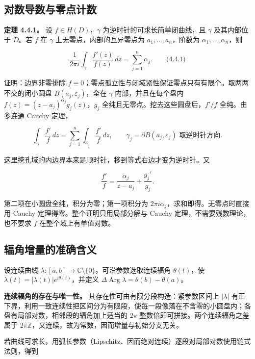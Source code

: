\documentclass[11pt,a4paper]{article}
\begin{document}
\subsection{对数导数与零点计数}\label{ch04-s4-heading-1}

\textbf{定理 4.4.1。} 设 \(f\in H(D)\)，\(\gamma\)
为逆时针的可求长简单闭曲线，且 \(\gamma\) 及其内部位于 \(D\)。若 \(f\)
在 \(\gamma\) 上无零点，内部的互异零点为 \(a_1,\ldots,a_n\)，阶数为
\(\alpha_1,\ldots,\alpha_n\)，则

\[
\frac1{2\pi i}\int_\gamma\frac{f'(z)}{f(z)}\,dz
=\sum_{j=1}^n\alpha_j.
\qquad\text{(4.4.1)}
\]

证明：边界非零排除
\(f\equiv0\)；零点孤立性与闭域紧性保证零点只有有限个。取两两不交的闭小圆盘
\(\overline{B(a_j,\varepsilon_j)}\)，全在 \(\gamma\)
内部，并且在每个盘内 \(f(z)=(z-a_j)^{\alpha_j}g_j(z)\)，\(g_j\)
全纯且无零点。挖去这些圆盘后，\(f'/f\) 全纯。由多连通 Cauchy 定理，

\[
\int_\gamma\frac{f'}f\,dz
=\sum_{j=1}^n\int_{\gamma_j}\frac{f'}f\,dz,
\qquad \gamma_j=\partial B(a_j,\varepsilon_j)\text{ 取逆时针方向}.
\]

这里挖孔域的内边界本来是顺时针，移到等式右边才变为逆时针。又

\[
\frac{f'}f=\frac{\alpha_j}{z-a_j}+\frac{g_j'}{g_j}.
\]

第二项在小圆盘全纯，积分为零；第一项积分为
\(2\pi i\alpha_j\)，求和即得。无零点时直接用 Cauchy
定理得零。整个证明只用局部分解与 Cauchy 定理，不需要残数理论，也不要求
\(f\) 在整个域上有单值对数。

\subsection{辐角增量的准确含义}\label{ch04-s4-heading-2}

设连续曲线
\(\lambda:[a,b]\to\mathbb C\setminus\{0\}\)。可沿参数选取连续辐角
\(\theta(t)\)，使 \(\lambda(t)=|\lambda(t)|e^{i\theta(t)}\)，并定义
\(\Delta\operatorname{Arg}\lambda=\theta(b)-\theta(a)\)。

\textbf{连续辐角的存在与唯一性。} 其存在性可由有限分段构造：紧参数区间上
\(|\lambda|\)
有正下界，利用一致连续性把区间分为有限段，使每一段像落在不含零的小圆盘内；各盘有局部对数，相邻段的辐角加上适当的
\(2\pi\) 整数倍即可拼接。两个连续辐角之差属于
\(2\pi\mathbb Z\)，又连续，故为常数，因而增量与初始分支无关。

若曲线可求长，用弧长参数（Lipschitz、因而绝对连续）逐段对局部对数使用链式法则，得到
\end{document}
